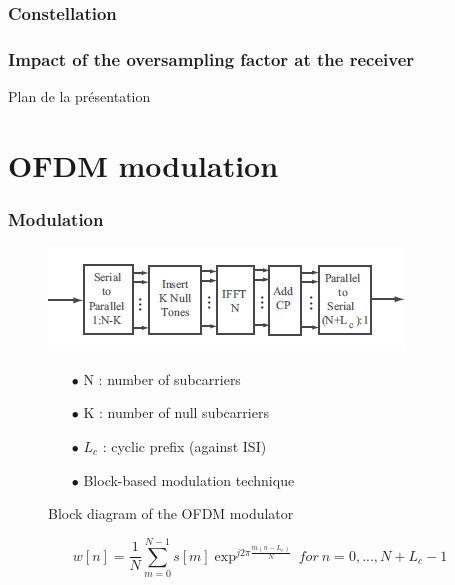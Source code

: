 \documentclass[11pt]{beamer}
\begin{document}
\subsubsection{Constellation}

\begin{frame}
\frametitle{Impact of the oversampling factor at the receiver}


\end{frame}

{
	\begin{frame}[noframenumbering]{Plan de la présentation}
		\tableofcontents
	\end{frame}
}

\section{OFDM modulation}
\begin{frame}
\frametitle{Modulation}

\begin{figure}[!ht]
    \begin{minipage}[b]{0.48\linewidth}
        \centering \includegraphics[scale=0.6]{img/OFDDM_modulator.png}
     \caption{Block diagram of the OFDM modulator}
     \label{fig2}
    \end{minipage}\hfill
    \begin{minipage}[b]{0.48\linewidth}  
    \centering  
    \begin{itemize}
    \item[$\bullet$] N : number of subcarriers
    \item[$\bullet$] K : number of null subcarriers
    \item[$\bullet$] $L_c$ : cyclic prefix (against ISI)
    \item[$\bullet$] Block-based modulation technique
    \end{itemize}
        
    \end{minipage}
\end{figure}
\begin{equation}
w[n]=\frac{1}{N} \sum_{m=0}^{N-1} s[m]\exp^{j2\pi\frac{m(n-L_c)}{N}}~for~n=0,...,N+L_c-1
\end{equation}
\end{frame}
\end{document}
